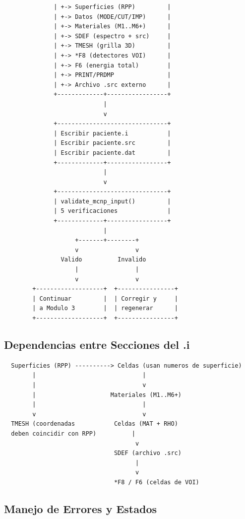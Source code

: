 \documentclass[12pt,a4paper]{article}
\begin{document}
\begin{lstlisting}
              | +-> Superficies (RPP)         |
              | +-> Datos (MODE/CUT/IMP)      |
              | +-> Materiales (M1..M6+)      |
              | +-> SDEF (espectro + src)     |
              | +-> TMESH (grilla 3D)         |
              | +-> *F8 (detectores VOI)      |
              | +-> F6 (energia total)        |
              | +-> PRINT/PRDMP               |
              | +-> Archivo .src externo      |
              +-------------+-----------------+
                            |
                            v
              +-------------------------------+
              | Escribir paciente.i           |
              | Escribir paciente.src         |
              | Escribir paciente.dat         |
              +-------------+-----------------+
                            |
                            v
              +-------------------------------+
              | validate_mcnp_input()         |
              | 5 verificaciones              |
              +-------------+-----------------+
                            |
                    +-------+--------+
                    v                v
                Valido          Invalido
                    |                |
                    v                v
        +-------------------+  +----------------+
        | Continuar         |  | Corregir y     |
        | a Modulo 3        |  | regenerar      |
        +-------------------+  +----------------+
\end{lstlisting}

\subsection{Dependencias entre Secciones del .i}

\begin{lstlisting}
  Superficies (RPP) ----------> Celdas (usan numeros de superficie)
        |                              |
        |                              v
        |                     Materiales (M1..M6+)
        |                              |
        v                              v
  TMESH (coordenadas           Celdas (MAT + RHO)
  deben coincidir con RPP)          |
                                     v
                               SDEF (archivo .src)
                                     |
                                     v
                               *F8 / F6 (celdas de VOI)
\end{lstlisting}

\subsection{Manejo de Errores y Estados}
\end{document}
